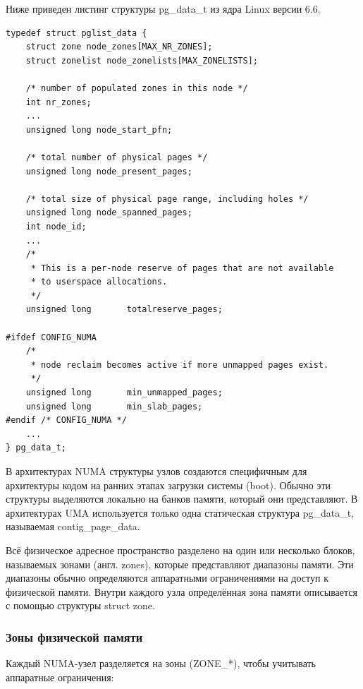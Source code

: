 Ниже приведен листинг структуры pg\_data\_t из ядра Linux версии 6.6.

\begin{lstlisting}[caption={struct pglist\_data}]
typedef struct pglist_data {
	struct zone node_zones[MAX_NR_ZONES];
	struct zonelist node_zonelists[MAX_ZONELISTS];

    /* number of populated zones in this node */
	int nr_zones;
    ...
	unsigned long node_start_pfn;

    /* total number of physical pages */
	unsigned long node_present_pages;

    /* total size of physical page range, including holes */
	unsigned long node_spanned_pages;
	int node_id;
    ...
	/*
	 * This is a per-node reserve of pages that are not available
	 * to userspace allocations.
	 */
	unsigned long		totalreserve_pages;

#ifdef CONFIG_NUMA
	/*
	 * node reclaim becomes active if more unmapped pages exist.
	 */
	unsigned long		min_unmapped_pages;
	unsigned long		min_slab_pages;
#endif /* CONFIG_NUMA */
    ...
} pg_data_t;
\end{lstlisting}

В архитектурах NUMA структуры узлов создаются специфичным для архитектуры кодом на ранних этапах загрузки системы (boot).
Обычно эти структуры выделяются локально на банков памяти, который они представляют.
В архитектурах UMA используется только одна статическая структура {pg\_data\_t}, называемая {contig\_page\_data}.

Всё физическое адресное пространство разделено на один или несколько блоков, называемых зонами (англ. zones), которые представляют диапазоны памяти.
Эти диапазоны обычно определяются аппаратными ограничениями на доступ к физической памяти.
Внутри каждого узла определённая зона памяти описывается с помощью структуры {struct zone}.~\cite{mem}

\subsubsection{Зоны физической памяти}

Каждый NUMA-узел разделяется на зоны (ZONE\_*), чтобы учитывать аппаратные ограничения:

